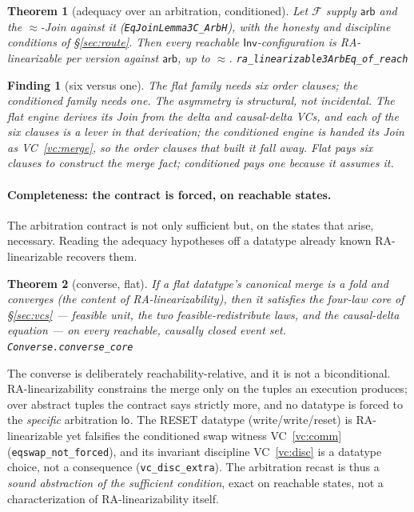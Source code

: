 \documentclass[11pt]{article}
\newtheorem{theorem}{Theorem}[section]
\newtheorem*{finding}{Finding}
\newcommand{\loE}[1]{\mathsf{lo}^{#1}}
\newcommand{\lean}[1]{\texttt{#1}}
\newcommand{\M}[1]{\mathcal{#1}}
\newcommand{\eqobs}{\approx}
\newcommand{\Inv}{\mathsf{Inv}}
\newcommand{\arb}{\mathsf{arb}}
\begin{document}
\begin{theorem}[adequacy over an arbitration, conditioned]
\label{thm:arbadequacyeq}
Let $\M{F}$ supply $\arb$ and the $\eqobs$-Join against it
(\lean{EqJoinLemma3C\_ArbH}), with the honesty and discipline conditions of
\S\ref{sec:route}. Then every reachable $\Inv$-configuration is
RA-linearizable per version against $\arb$, up to $\eqobs$.
\hfill\lean{ra\_linearizable3ArbEq\_of\_reach}
\end{theorem}

\begin{finding}[six versus one]
The flat family needs six order clauses; the conditioned family needs one.
The asymmetry is structural, not incidental. The flat engine \emph{derives}
its Join from the delta and causal-delta VCs, and each of the six clauses
is a lever in that derivation; the conditioned engine is \emph{handed} its
Join as VC~\ref{vc:merge}, so the order clauses that built it fall away.
Flat pays six clauses to construct the merge fact; conditioned pays one
because it assumes it.
\end{finding}

\paragraph{Completeness: the contract is forced, on reachable states.} The
arbitration contract is not only sufficient but, on the states that arise,
necessary. Reading the adequacy hypotheses off a datatype already known
RA-linearizable recovers them.

\begin{theorem}[converse, flat]
\label{thm:converse}
If a flat datatype's canonical merge is a fold and converges (the content
of RA-linearizability), then it satisfies the four-law core of
\S\ref{sec:vcs} --- feasible unit, the two feasible-redistribute laws, and
the causal-delta equation --- on every reachable, causally closed event
set.
\hfill\lean{Converse.converse\_core}
\end{theorem}

The converse is deliberately reachability-relative, and it is not a
biconditional. RA-linearizability constrains the merge only on the tuples
an execution produces; over abstract tuples the contract says strictly
more, and no datatype is forced to the \emph{specific} arbitration
$\loE{}$. The RESET datatype (write/write/reset) is RA-linearizable yet
falsifies the conditioned swap witness VC~\ref{vc:comm}
(\lean{eqswap\_not\_forced}), and its invariant discipline VC~\ref{vc:disc}
is a datatype choice, not a consequence (\lean{vc\_disc\_extra}). The
arbitration recast is thus a \emph{sound abstraction of the sufficient
condition}, exact on reachable states, not a characterization of
RA-linearizability itself.
\end{document}
